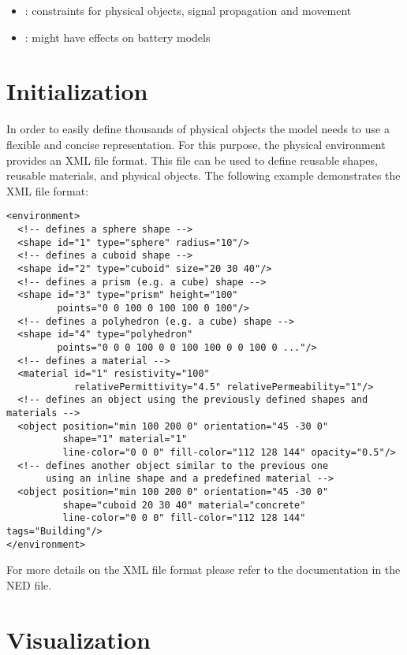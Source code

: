 \begin{itemize}
  \item {}: constraints for physical objects, signal propagation
and movement 
  \item {}: might have effects on battery models 
\end{itemize}
\fi

\section{Initialization}

In order to easily define thousands of physical objects the model needs to use a
flexible and concise representation. For this purpose, the physical environment
provides an XML file format. This file can be used to define reusable shapes,
reusable materials, and physical objects. The following example demonstrates the
XML file format:

\begin{verbatim}
<environment>
  <!-- defines a sphere shape -->
  <shape id="1" type="sphere" radius="10"/>
  <!-- defines a cuboid shape -->
  <shape id="2" type="cuboid" size="20 30 40"/>
  <!-- defines a prism (e.g. a cube) shape -->
  <shape id="3" type="prism" height="100"
         points="0 0 100 0 100 100 0 100"/>
  <!-- defines a polyhedron (e.g. a cube) shape -->
  <shape id="4" type="polyhedron"
         points="0 0 0 100 0 0 100 100 0 0 100 0 ..."/>
  <!-- defines a material -->
  <material id="1" resistivity="100"
            relativePermittivity="4.5" relativePermeability="1"/>
  <!-- defines an object using the previously defined shapes and materials -->
  <object position="min 100 200 0" orientation="45 -30 0"
          shape="1" material="1"
          line-color="0 0 0" fill-color="112 128 144" opacity="0.5"/>
  <!-- defines another object similar to the previous one
       using an inline shape and a predefined material -->
  <object position="min 100 200 0" orientation="45 -30 0"
          shape="cuboid 20 30 40" material="concrete"
          line-color="0 0 0" fill-color="112 128 144" tags="Building"/>
</environment>          
\end{verbatim}

For more details on the XML file format please refer to the documentation in the
 NED file.

\section{Visualization}

